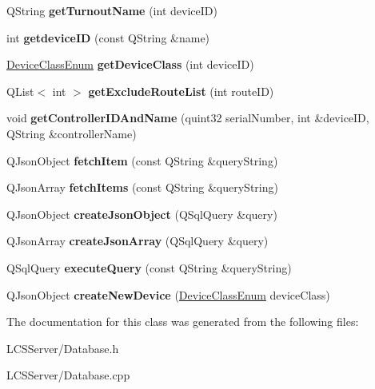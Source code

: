 \begin{DoxyCompactItemize}
Q\+String {\bfseries get\+Turnout\+Name} (int device\+ID)
\item 
\mbox{\label{class_database_aefd61c538939ce9b79c85c2df6914447}} 
int {\bfseries getdevice\+ID} (const Q\+String \&name)
\item 
\mbox{\label{class_database_aaa5f3cfe0c9dc902c3e8d688e8f954d7}} 
\hyperlink{_global_defs_8h_ad17679fac69973be9b3a2787a60d7722}{Device\+Class\+Enum} {\bfseries get\+Device\+Class} (int device\+ID)
\item 
\mbox{\label{class_database_a34aaa93240ff4b005b10e44ba1c6eaba}} 
Q\+List$<$ int $>$ {\bfseries get\+Exclude\+Route\+List} (int route\+ID)
\item 
\mbox{\label{class_database_a52a865e7e0e177dab5c0a451f37a1d1a}} 
void {\bfseries get\+Controller\+I\+D\+And\+Name} (quint32 serial\+Number, int \&device\+ID, Q\+String \&controller\+Name)
\item 
\mbox{\label{class_database_a1d17037c1dfaa2f67327ae0297d4567a}} 
Q\+Json\+Object {\bfseries fetch\+Item} (const Q\+String \&query\+String)
\item 
\mbox{\label{class_database_a1b1bd2990fdc80d0f4ed51f571966272}} 
Q\+Json\+Array {\bfseries fetch\+Items} (const Q\+String \&query\+String)
\item 
\mbox{\label{class_database_a82058cf13df09949bc4f6e28ce4931ba}} 
Q\+Json\+Object {\bfseries create\+Json\+Object} (Q\+Sql\+Query \&query)
\item 
\mbox{\label{class_database_a27d4e89a6c9e7bdd79a4548dcc0bafa7}} 
Q\+Json\+Array {\bfseries create\+Json\+Array} (Q\+Sql\+Query \&query)
\item 
\mbox{\label{class_database_a153d5c808b5da86954ef73b164ece2bf}} 
Q\+Sql\+Query {\bfseries execute\+Query} (const Q\+String \&query\+String)
\item 
\mbox{\label{class_database_ac376543b45d60d217357ca04209ca1e5}} 
Q\+Json\+Object {\bfseries create\+New\+Device} (\hyperlink{_global_defs_8h_ad17679fac69973be9b3a2787a60d7722}{Device\+Class\+Enum} device\+Class)
\end{DoxyCompactItemize}


The documentation for this class was generated from the following files\+:\begin{DoxyCompactItemize}
\item 
L\+C\+S\+Server/Database.\+h\item 
L\+C\+S\+Server/Database.\+cpp\end{DoxyCompactItemize}
